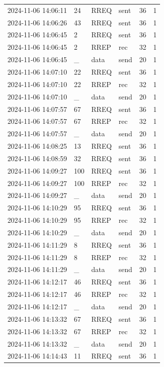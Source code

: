 \documentclass[]{nsm-thesis}
\begin{document}
\begin{longtable}{llllll}
2024-11-06 14:06:11 & 24 & RREQ & sent & 36 & 1 \\
2024-11-06 14:06:26 & 43 & RREQ & sent & 36 & 1 \\
2024-11-06 14:06:45 & 2 & RREQ & sent & 36 & 1 \\
2024-11-06 14:06:45 & 2 & RREP & rec & 32 & 1 \\
2024-11-06 14:06:45 & _ & data & send & 20 & 1 \\
2024-11-06 14:07:10 & 22 & RREQ & sent & 36 & 1 \\
2024-11-06 14:07:10 & 22 & RREP & rec & 32 & 1 \\
2024-11-06 14:07:10 & _ & data & send & 20 & 1 \\
2024-11-06 14:07:57 & 67 & RREQ & sent & 36 & 1 \\
2024-11-06 14:07:57 & 67 & RREP & rec & 32 & 1 \\
2024-11-06 14:07:57 & _ & data & send & 20 & 1 \\
2024-11-06 14:08:25 & 13 & RREQ & sent & 36 & 1 \\
2024-11-06 14:08:59 & 32 & RREQ & sent & 36 & 1 \\
2024-11-06 14:09:27 & 100 & RREQ & sent & 36 & 1 \\
2024-11-06 14:09:27 & 100 & RREP & rec & 32 & 1 \\
2024-11-06 14:09:27 & _ & data & send & 20 & 1 \\
2024-11-06 14:10:29 & 95 & RREQ & sent & 36 & 1 \\
2024-11-06 14:10:29 & 95 & RREP & rec & 32 & 1 \\
2024-11-06 14:10:29 & _ & data & send & 20 & 1 \\
2024-11-06 14:11:29 & 8 & RREQ & sent & 36 & 1 \\
2024-11-06 14:11:29 & 8 & RREP & rec & 32 & 1 \\
2024-11-06 14:11:29 & _ & data & send & 20 & 1 \\
2024-11-06 14:12:17 & 46 & RREQ & sent & 36 & 1 \\
2024-11-06 14:12:17 & 46 & RREP & rec & 32 & 1 \\
2024-11-06 14:12:17 & _ & data & send & 20 & 1 \\
2024-11-06 14:13:32 & 67 & RREQ & sent & 36 & 1 \\
2024-11-06 14:13:32 & 67 & RREP & rec & 32 & 1 \\
2024-11-06 14:13:32 & _ & data & send & 20 & 1 \\
2024-11-06 14:14:43 & 11 & RREQ & sent & 36 & 1 \\

\end{longtable}
\end{document}
